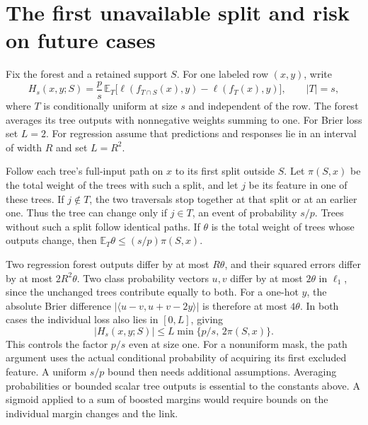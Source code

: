 \section{The first unavailable split and risk on future cases}
\label{app:first-split}
Fix the forest and a retained support $S$. For one labeled row $(x,y)$,
write
\[
  H_s(x,y;S)=\frac{p}{s}\,\mathbb E_T
  \bigl[\ell(f_{T\cap S}(x),y)-\ell(f_T(x),y)\bigr],
  \qquad |T|=s ,
\]
where $T$ is conditionally uniform at size $s$ and independent of the row.
The forest averages its tree outputs with nonnegative weights summing to
one. For Brier loss set $L=2$. For regression assume that predictions and
responses lie in an interval of width $R$ and set $L=R^2$.

Follow each tree's full-input path on $x$ to its first split outside $S$.
Let $\pi(S,x)$ be the total weight of the trees with such a split, and let
$j$ be its feature in one of these trees. If $j\notin T$, the two traversals
stop together at that split or at an earlier one. Thus the tree can change
only if $j\in T$, an event of probability $s/p$. Trees without such a split
follow identical paths. If $\theta$ is the total weight of trees whose
outputs change, then $\mathbb E_T\theta\le(s/p)\pi(S,x)$.

Two regression forest outputs differ by at most $R\theta$, and their
squared errors differ by at most $2R^2\theta$. Two class probability vectors
$u,v$ differ by at most $2\theta$ in $\ell_1$, since the unchanged trees
contribute equally to both. For a one-hot $y$, the absolute Brier difference
$|\langle u-v,u+v-2y\rangle|$ is therefore at most $4\theta$. In both cases
the individual loss also lies in $[0,L]$, giving
\[
  |H_s(x,y;S)|\le L\min\{p/s,\,2\pi(S,x)\}.
\]
This controls the factor $p/s$ even at size one. For a nonuniform mask,
the path argument uses the actual conditional probability of acquiring
its first excluded feature. A uniform $s/p$ bound then needs additional
assumptions. Averaging probabilities or bounded scalar tree outputs is
essential to the constants above. A sigmoid applied to a sum of boosted
margins would require bounds on the individual margin changes and the link.

